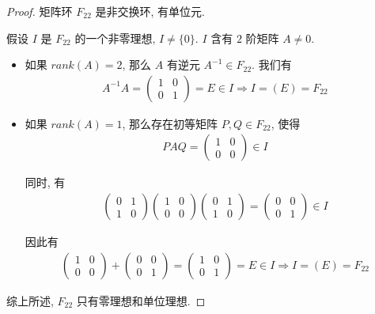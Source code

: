 \documentclass[utf8]{ctexbook}
\begin{document}
\begin{proof}
矩阵环 $F_{22}$ 是非交换环, 有单位元.

假设 $I$ 是 $F_{22}$ 的一个非零理想, $I \neq \{ 0 \}$. $I$ 含有 $2$ 阶矩阵 $A \neq 0$.
\begin{itemize}
\item{如果 $rank(A) = 2$, 那么 $A$ 有逆元 $A^{-1} \in F_{22}$. 我们有
\begin{align*}
A^{-1} A = \left(
\begin{array}{cc}
1 & 0 \\
0 & 1
\end{array}
\right)
= E \in I \Longrightarrow I = (E) = F_{22}
\end{align*}
}
\item{如果 $rank(A)=1$, 那么存在初等矩阵 $P, Q \in F_{22}$, 使得
\begin{align*}
P A Q = \left(
\begin{array}{cc}
1 & 0 \\
0 & 0
\end{array}
\right)
\in I
\end{align*}

同时, 有
\begin{align*}
\left(
\begin{array}{cc}
0 & 1 \\
1 & 0
\end{array}
\right) 
\left(
\begin{array}{cc}
1 & 0 \\
0 & 0
\end{array}
\right)
\left(
\begin{array}{cc}
0 & 1 \\
1 & 0
\end{array}
\right) = 
\left(
\begin{array}{cc}
0 & 0 \\
0 & 1
\end{array}
\right) \in I
\end{align*}

因此有
\begin{align*}
\left(
\begin{array}{cc}
1 & 0 \\
0 & 0
\end{array}
\right)
+
\left(
\begin{array}{cc}
0 & 0 \\
0 & 1
\end{array}
\right)
= 
\left(
\begin{array}{cc}
1 & 0 \\
0 & 1
\end{array}
\right)
= E \in I
\Longrightarrow I = (E) = F_{22}
\end{align*}
}
\end{itemize}
综上所述, $F_{22}$ 只有零理想和单位理想.



\end{proof}
\end{document}
